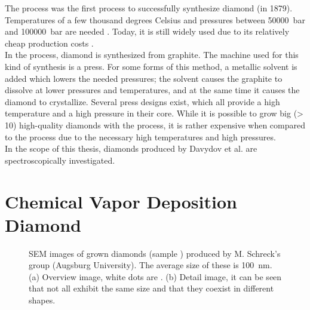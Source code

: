 	The \HPHT process was the first process to successfully synthesize diamond (in 1879).
	Temperatures of a few thousand degrees Celsius and pressures between \SI{50000}{bar} and \SI{100000}{bar} are needed \cite{davis1993diamond}.
	Today, it is still widely used due to its relatively cheap production costs \cite{wikiSyntheticDiamond}.
	\\
	In the \HPHT process, diamond is synthesized from graphite.
	The machine used for this kind of synthesis is a press.
	For some forms of this method, a metallic solvent is added which lowers the needed pressures; the solvent causes the graphite to dissolve at lower pressures and temperatures, and at the same time it causes the diamond to crystallize.
	Several press designs exist, which all provide a high temperature and a high pressure in their core.
	While it is possible to grow big (> \SI{10}{\carat}) high-quality diamonds with the \HPHT process, it is rather expensive when compared to the \CVD process due to the necessary high temperatures and high pressures.
	\\
	In the scope of this thesis, \HPHT diamonds produced by Davydov et al. \cite{Davydov2014} are spectroscopically investigated.


\section[CVD]{Chemical Vapor Deposition Diamond}\label{sec::cvd}

	\begin{figure}[tp]
		\begin{subfigure}[t]{ 0.49\linewidth}
			\caption{}\label{subfig::cvd_large}
			\centering
		\end{subfigure}
		\hfill
		\begin{subfigure}[t]{ 0.49\linewidth}
			\caption{}\label{subfig::cvd_detail}
			\centering
		\end{subfigure}
		\caption{SEM images of \CVD grown diamonds (sample \insitucvd) produced by M. Schreck's group (Augsburg University). The average size of these \nds is \SI{100}{nm}. (a) Overview image, white dots are \nds. (b) Detail image, it can be seen that not all \nds exhibit the same size and that they coexist in different shapes.}
		\label{fig::sem_cvd}
	\end{figure}


